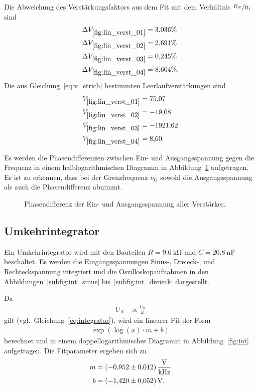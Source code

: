 Die Abweichung des Verstärkungsfaktors aus dem Fit mit dem Verhältnis $\sfrac{R_N}{R_1}$
sind
\begin{align*}
  \Delta V_{\ref{fig:lin_verst_01}} &= \num{3.036}\% \\
  \Delta V_{\ref{fig:lin_verst_02}} &= \num{2.691}\% \\
  \Delta V_{\ref{fig:lin_verst_03}} &= \num{0.245}\% \\
  \Delta V_{\ref{fig:lin_verst_04}} &= \num{8.604}\%.
\end{align*}
Die aus Gleichung~\eqref{eq:v_strich} bestimmten Leerlaufverstärkungen sind
\begin{align*}
  V_{\ref{fig:lin_verst_01}} &= \num{75.07} \\
  V_{\ref{fig:lin_verst_02}} &= \num{-19.08} \\
  V_{\ref{fig:lin_verst_03}} &= \num{-1921.62} \\
  V_{\ref{fig:lin_verst_04}} &= \num{  8.60}.
\end{align*}

Es werden die Phasendifferenzen zwischen Ein- und Ausgangsspannung gegen die Frequenz
in einem halblogarithmischen Diagramm in Abbildung~\ref{fig:phasendiff} aufgetragen.
Es ist zu erkennen, dass bei der Grenzfrequenz $\nu_\text{G}$ sowohl die Ausgangsspannung als auch die Phasendifferenz abnimmt.

\begin{figure}[ht]
  \centering
  
  \caption{Phasendifferenz der Ein- und Ausgangsspannung aller Verstärker.}
  \label{fig:phasendiff}
\end{figure}

\FloatBarrier
\subsection{Umkehrintegrator}
Ein Umkehrintegrator wird mit den Bauteilen $R = \SI{9.6}{\kilo\ohm}$ und $C = \SI{20.8}{\nano\farad}$ beschaltet.
Es werden die Eingangsspannungen Sinus-, Dreieck-, und Rechteckspannung integriert und die Oszilloskopaufnahmen in den Abbildungen~\ref{subfig:int_sinus} bis~\ref{subfig:int_dreieck} dargestellt.

Da
\begin{align*}
  U_\text{A} &\propto \frac{U_0}{\omega}
\end{align*}
gilt (vgl.\ Gleichung~\eqref{eq:integrator}),
wird ein linearer Fit der Form
\begin{align*}
  \exp{\left(\log{\left(x\right)} \cdot m + b\right)}
\end{align*}
berechnet und in einem doppellogarithmisches Diagramm in Abbildung~\ref{fig:int} aufgetragen.
Die Fitparameter ergeben sich zu
\begin{align*}
  m &= \SI{-0.952 \pm 0.012}{\volt\per\kilo\hertz} \\
  b &= \SI{-1.42 \pm 0.052}{\volt}.
\end{align*}

